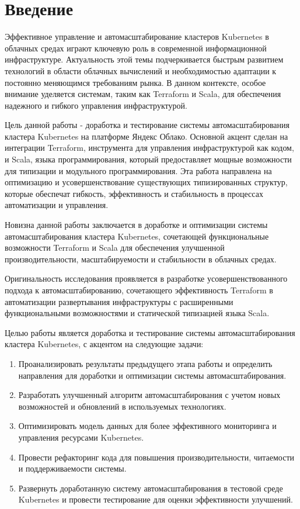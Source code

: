 \chapter*{Введение}
\label{sec:afterwords}

Эффективное управление и автомасштабирование кластеров Kubernetes в облачных
средах играют ключевую роль в современной информационной инфраструктуре.
Актуальность этой темы подчеркивается быстрым развитием технологий в области
облачных вычислений и необходимостью адаптации к постоянно меняющимся
требованиям рынка. В данном контексте, особое внимание уделяется системам, таким
как Terraform и Scala, для обеспечения надежного и гибкого управления
инфраструктурой.

Цель данной работы - доработка и тестирование системы автомасштабирования
кластера Kubernetes на платформе Яндекс Облако. Основной акцент сделан на
интеграции Terraform, инструмента для управления инфраструктурой как кодом, и
Scala, языка программирования, который предоставляет мощные возможности для
типизации и модульного программирования. Эта работа направлена на оптимизацию и
усовершенствование существующих типизированных структур, которые обеспечат
гибкость, эффективность и стабильность в процессах автоматизации и управления.

Новизна данной работы заключается в доработке и оптимизации системы
автомасштабирования кластера Kubernetes, сочетающей функциональные возможности
Terraform и Scala для обеспечения улучшенной производительности,
масштабируемости и стабильности в облачных средах.

Оригинальность исследования проявляется в разработке усовершенствованного
подхода к автомасштабированию, сочетающего эффективность Terraform в
автоматизации развертывания инфраструктуры с расширенными функциональными
возможностями и статической типизацией языка Scala.

Целью работы является доработка и тестирование системы автомасштабирования
кластера Kubernetes, с акцентом на следующие задачи:

\begin{enumerate}
\item Проанализировать результаты предыдущего этапа работы и определить
направления для доработки и оптимизации системы автомасштабирования.
\item Разработать улучшенный алгоритм автомасштабирования с учетом новых
возможностей и обновлений в используемых технологиях.
\item Оптимизировать модель данных для более эффективного мониторинга и
управления ресурсами Kubernetes.
\item Провести рефакторинг кода для повышения производительности, читаемости и
поддерживаемости системы.
\item Развернуть доработанную систему автомасштабирования в тестовой среде
Kubernetes и провести тестирование для оценки эффективности улучшений.
\end{enumerate}

